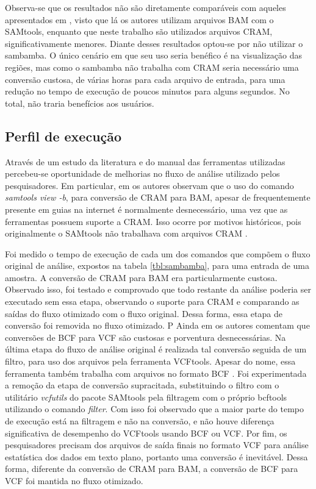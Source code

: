 \documentclass[cic,tc]{iiufrgs}
\begin{document}
Observa-se que os resultados não são diretamente comparáveis com aqueles
apresentados em \cite{tarasov2015sambamba}, visto que lá os autores utilizam
arquivos BAM com o SAMtools, enquanto que neste trabalho são utilizados
arquivos CRAM, significativamente menores. Diante desses resultados optou-se
por não utilizar o sambamba. O único cenário em que seu uso seria benéfico é na
visualização das regiões, mas como o sambamba não trabalha com CRAM seria
necessário uma conversão custosa, de várias horas para cada arquivo de entrada,
para uma redução no tempo de execução de poucos minutos para alguns segundos.
No total, não traria benefícios aos usuários.

\subsection{Perfil de execução}

Através de um estudo da literatura e do manual das ferramentas utilizadas
percebeu-se oportunidade de melhorias no fluxo de análise utilizado pelos
pesquisadores. Em particular, em \cite{danecek2021twelve} os autores observam
que o uso do comando \textit{samtools view -b}, para conversão de CRAM para
BAM, apesar de frequentemente presente em guias na internet é normalmente
desnecessário, uma vez que as ferramentas possuem suporte a CRAM. Isso ocorre
por motivos históricos, pois originalmente o SAMtools não trabalhava com
arquivos CRAM \cite{danecek2021twelve}.

Foi medido o tempo de execução de cada um dos comandos que compõem o fluxo
original de análise, expostos na tabela \ref{tbl:sambamba}, para uma entrada
de uma amostra. A conversão de CRAM para BAM era particularmente custosa.
Observado isso, foi testado e comprovado que todo restante da análise poderia
ser executado sem essa etapa, observando o suporte para CRAM e comparando as
saídas do fluxo otimizado com o fluxo original. Dessa forma, essa etapa de
conversão foi removida no fluxo otimizado.
P
Ainda em \cite{danecek2021twelve} os autores comentam que conversões de BCF
para VCF são custosas e porventura desnecessárias. Na última etapa do fluxo de
análise original é realizada tal conversão seguida de um filtro, para uso dos
arquivos pela ferramenta VCFtools. Apesar do nome, essa ferramenta também
trabalha com arquivos no formato BCF \cite{man2015vcftools}. Foi experimentada a
remoção da etapa de conversão supracitada, substituindo o filtro com o
utilitário \textit{vcfutils} do pacote SAMtools pela filtragem com o próprio
bcftools utilizando o comando \textit{filter}. Com isso foi observado que a
maior parte do tempo de execução está na filtragem e não na conversão, e não
houve diferença significativa de desempenho do VCFtools usando BCF ou VCF. Por
fim, os pesquisadores precisam dos arquivos de saída finais no formato VCF para
análise estatística dos dados em texto plano, portanto uma conversão é
inevitável. Dessa forma, diferente da conversão de CRAM para BAM, a conversão
de BCF para VCF foi mantida no fluxo otimizado.
\end{document}
